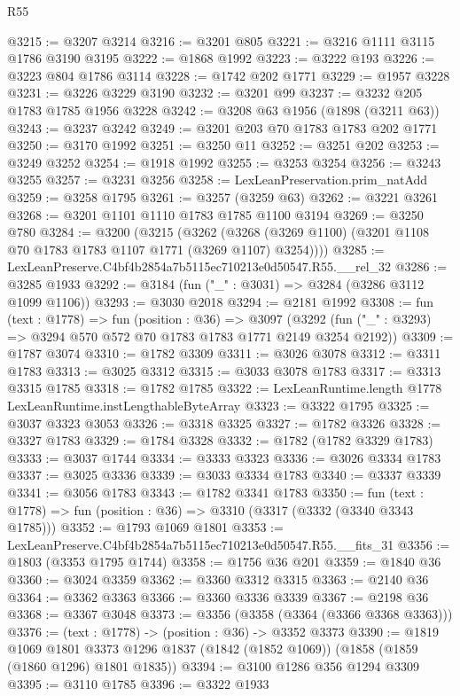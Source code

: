 \begin{lexlean}{R55}
\begin{coremodule}
@3215 := @3207 @3214
@3216 := @3201 @805
@3221 := @3216 @1111 @3115 @1786 @3190 @3195
@3222 := @1868 @1992
@3223 := @3222 @193
@3226 := @3223 @804 @1786 @3114
@3228 := @1742 @202 @1771
@3229 := @1957 @3228
@3231 := @3226 @3229 @3190
@3232 := @3201 @99
@3237 := @3232 @205 @1783 @1785 @1956 @3228
@3242 := @3208 @63 @1956 (@1898 (@3211 @63))
@3243 := @3237 @3242
@3249 := @3201 @203 @70 @1783 @1783 @202 @1771
@3250 := @3170 @1992
@3251 := @3250 @11
@3252 := @3251 @202
@3253 := @3249 @3252
@3254 := @1918 @1992
@3255 := @3253 @3254
@3256 := @3243 @3255
@3257 := @3231 @3256
@3258 := LexLeanPreservation.prim_natAdd
@3259 := @3258 @1795
@3261 := @3257 (@3259 @63)
@3262 := @3221 @3261
@3268 := @3201 @1101 @1110 @1783 @1785 @1100 @3194
@3269 := @3250 @780
@3284 := @3200
    (@3215
      (@3262 (@3268 (@3269 @1100) (@3201 @1108 @70 @1783 @1783 @1107 @1771 (@3269 @1107) @3254))))
@3285 := LexLeanPreserve.C4bf4b2854a7b5115ec710213e0d50547.R55.__rel_32
@3286 := @3285 @1933
@3292 := @3184 (fun ("_" : @3031) => @3284 (@3286 @3112 @1099 @1106))
@3293 := @3030 @2018
@3294 := @2181 @1992
@3308 := fun (text : @1778) =>
  fun (position : @36) =>
  @3097 (@3292 (fun ("_" : @3293) => @3294 @570 @572 @70 @1783 @1783 @1771 @2149 @3254 @2192))
@3309 := @1787 @3074
@3310 := @1782 @3309
@3311 := @3026 @3078
@3312 := @3311 @1783
@3313 := @3025 @3312
@3315 := @3033 @3078 @1783
@3317 := @3313 @3315 @1785
@3318 := @1782 @1785
@3322 := LexLeanRuntime.length @1778 LexLeanRuntime.instLengthableByteArray
@3323 := @3322 @1795
@3325 := @3037 @3323 @3053
@3326 := @3318 @3325
@3327 := @1782 @3326
@3328 := @3327 @1783
@3329 := @1784 @3328
@3332 := @1782 (@1782 @3329 @1783)
@3333 := @3037 @1744
@3334 := @3333 @3323
@3336 := @3026 @3334 @1783
@3337 := @3025 @3336
@3339 := @3033 @3334 @1783
@3340 := @3337 @3339
@3341 := @3056 @1783
@3343 := @1782 @3341 @1783
@3350 := fun (text : @1778) => fun (position : @36) => @3310 (@3317 (@3332 (@3340 @3343 @1785)))
@3352 := @1793 @1069 @1801
@3353 := LexLeanPreserve.C4bf4b2854a7b5115ec710213e0d50547.R55.__fits_31
@3356 := @1803 (@3353 @1795 @1744)
@3358 := @1756 @36 @201
@3359 := @1840 @36
@3360 := @3024 @3359
@3362 := @3360 @3312 @3315
@3363 := @2140 @36
@3364 := @3362 @3363
@3366 := @3360 @3336 @3339
@3367 := @2198 @36
@3368 := @3367 @3048
@3373 := @3356 (@3358 (@3364 (@3366 @3368 @3363)))
@3376 := (text : @1778) -> (position : @36) -> @3352 @3373
@3390 := @1819
    @1069
    @1801
    @3373
    @1296
    @1837
    (@1842 (@1852 @1069))
    (@1858 (@1859 (@1860 @1296) @1801 @1835))
@3394 := @3100 @1286 @356 @1294 @3309
@3395 := @3110 @1785
@3396 := @3322 @1933

\end{coremodule}
\end{lexlean}
